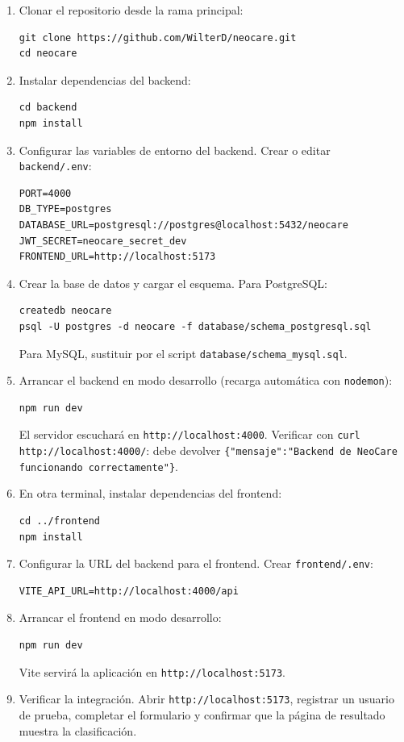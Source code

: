 \documentclass[12pt,letterpaper]{article}
\begin{document}
\begin{enumerate}
    \item Clonar el repositorio desde la rama principal:
    \begin{verbatim}
git clone https://github.com/WilterD/neocare.git
cd neocare
    \end{verbatim}

    \item Instalar dependencias del backend:
    \begin{verbatim}
cd backend
npm install
    \end{verbatim}

    \item Configurar las variables de entorno del backend. Crear o editar \texttt{backend/.env}:
    \begin{verbatim}
PORT=4000
DB_TYPE=postgres
DATABASE_URL=postgresql://postgres@localhost:5432/neocare
JWT_SECRET=neocare_secret_dev
FRONTEND_URL=http://localhost:5173
    \end{verbatim}

    \item Crear la base de datos y cargar el esquema. Para PostgreSQL:
    \begin{verbatim}
createdb neocare
psql -U postgres -d neocare -f database/schema_postgresql.sql
    \end{verbatim}
    Para MySQL, sustituir por el script \texttt{database/schema\_mysql.sql}.

    \item Arrancar el backend en modo desarrollo (recarga automática con \texttt{nodemon}):
    \begin{verbatim}
npm run dev
    \end{verbatim}
    El servidor escuchará en \texttt{http://localhost:4000}. Verificar con \texttt{curl http://localhost:4000/}: debe devolver \texttt{\{"mensaje":"Backend de NeoCare funcionando correctamente"\}}.

    \item En otra terminal, instalar dependencias del frontend:
    \begin{verbatim}
cd ../frontend
npm install
    \end{verbatim}

    \item Configurar la URL del backend para el frontend. Crear \texttt{frontend/.env}:
    \begin{verbatim}
VITE_API_URL=http://localhost:4000/api
    \end{verbatim}

    \item Arrancar el frontend en modo desarrollo:
    \begin{verbatim}
npm run dev
    \end{verbatim}
    Vite servirá la aplicación en \texttt{http://localhost:5173}.

    \item Verificar la integración. Abrir \texttt{http://localhost:5173}, registrar un usuario de prueba, completar el formulario y confirmar que la página de resultado muestra la clasificación.
\end{enumerate}
\end{document}
